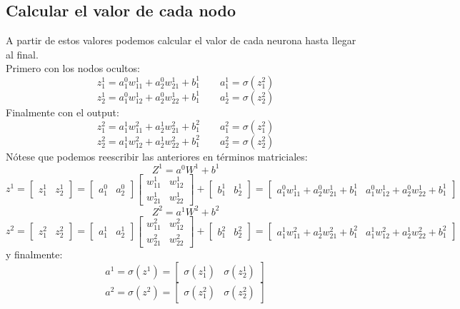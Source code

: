 \documentclass{article}
\begin{document}
	\subsection{Calcular el valor de cada nodo}
	A partir de estos valores podemos calcular el valor de cada neurona hasta llegar al final. \\
	Primero con los nodos ocultos:
	\[
	z^1_1 = a^0_1w^1_{11} + a^0_2w^1_{21} + b^1_1 \qquad
	a^1_1 = \sigma (z^2_1)
	\]
	\[
	z^1_2 = a^0_1w^1_{12} + a^0_2w^1_{22} + b^1_1 \qquad
	a^1_2 = \sigma (z^2_2)
	\]
	Finalmente con el output:\\
	\[
	z^2_1 = a^1_1w^2_{11} + a^1_2w^2_{21} + b^2_1 \qquad
	a^2_1 = \sigma (z^2_1)
	\]
	\[
	z^2_2 = a^1_1w^2_{12} + a^1_2w^2_{22} + b^2_1 \qquad
	a^2_2 = \sigma (z^2_2)
	\]
	Nótese que podemos reescribir las anteriores en términos matriciales:
	\[
	Z^1 = a^0 W^1 + b^1
	\]
	\[
	z^1 = 	\begin{bmatrix}
		z^1_1 & z^1_2
	\end{bmatrix} = \begin{bmatrix}
		a^0_1 & a^0_2
	\end{bmatrix} 
	\begin{bmatrix}
		w^1_{11} & w^1_{12}  \\
		w^1_{21} & w^1_{22}
	\end{bmatrix}
	+ 
\begin{bmatrix}
		b^1_1 & b^1_2
	\end{bmatrix} = 
	\begin{bmatrix}
		a^0_1w^1_{11} + a^0_2w^1_{21} + b^1_1 & a^0_1w^1_{12} + a^0_2w^1_{22} + b^1_1
	\end{bmatrix} 
	\]
	\[
Z^2 = a^1 W^2 + b^2
\]
\[
z^2 = 	\begin{bmatrix}
	z^2_1 & z^2_2
\end{bmatrix} = \begin{bmatrix}
	a^1_1 & a^1_2
\end{bmatrix} 
\begin{bmatrix}
	w^2_{11} & w^2_{12}  \\
	w^2_{21} & w^2_{22}
\end{bmatrix}
+ 
\begin{bmatrix}
	b^2_1 & b^2_2
\end{bmatrix} = 
\begin{bmatrix}
	a^1_1w^2_{11} + a^1_2w^2_{21} + b^2_1 & a^1_1w^2_{12} + a^1_2w^2_{22} + b^2_1
\end{bmatrix} 
\]
y finalmente:
\[
a^1 = \sigma(z^1) = \begin{bmatrix}
	\sigma(z^1_1) & \sigma(z^1_2)
\end{bmatrix} 
\]
\[
a^2 = \sigma(z^2) = \begin{bmatrix}
	\sigma(z^2_1) & \sigma(z^2_2)
\end{bmatrix} 
\]
\end{document}
